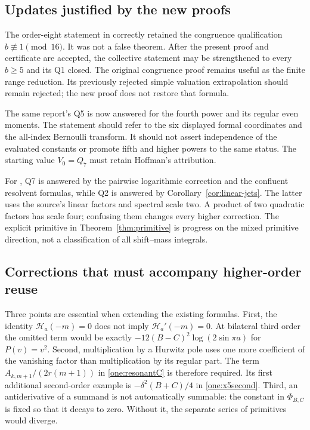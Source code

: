 \subsection{Updates justified by the new proofs}

The order-eight statement in \cite{Reconstruction} correctly retained
the congruence qualification $b\not\equiv1\pmod{16}$.  It was not a
false theorem.  After the present proof and certificate are accepted,
the collective statement may be strengthened to every $b\ge5$ and its
Q1 closed.  The original congruence proof remains useful as the finite
range reduction.  Its previously rejected simple valuation extrapolation
should remain rejected; the new proof does not restore that formula.

The same report's Q5 is now answered for the fourth power and its
regular even moments.  The statement should refer to the six displayed
formal coordinates and the all-index Bernoulli transform.  It should
not assert independence of the evaluated constants or promote fifth
and higher powers to the same status.  The starting value $V_0=Q_7$
must retain Hoffman's attribution.

For \cite{Quadratic}, Q7 is answered by the pairwise logarithmic
correction and the confluent resolvent formulas, while Q2 is answered
by Corollary~\ref{cor:linear-jets}.  The latter uses the source's
linear factors and spectral scale two.  A product of two quadratic
factors has scale four; confusing them changes every higher correction.
The explicit primitive in Theorem~\ref{thm:primitive} is progress on
the mixed primitive direction, not a classification of all shift--mass
integrals.

\subsection{Corrections that must accompany higher-order reuse}

Three points are essential when extending the existing formulas.
First, the identity $\mathcal H_a(-m)=0$ does not imply
$\mathcal H_a'(-m)=0$.  At bilateral third order the omitted term
would be exactly $-12(B-C)^2\log(2\sin\pi a)$ for $P(v)=v^2$.
Second, multiplication by a Hurwitz pole uses one more coefficient
of the vanishing factor than multiplication by its regular part.
The term $A_{k,m+1}/(2r(m+1))$ in
\eqref{one:resonantC} is therefore required.  Its first additional
second-order example is $-\delta^2(B+C)/4$ in
\eqref{one:x5second}.  Third, an antiderivative of a summand is not
automatically summable: the constant in $\Phi_{B,C}$ is fixed so
that it decays to zero.  Without it, the separate series of primitives
would diverge.

